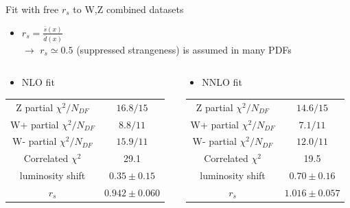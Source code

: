 \begin{frame}{Fit with free $r_s$ to W,Z combined datasets}
\begin{itemize}
\item{$r_s = \frac{\bar{s}(x)}{\bar{d}(x)}$ \\
$\rightarrow$  $r_s \simeq 0.5$ (suppressed strangeness) is assumed in many PDFs}
\end{itemize}

\begin{columns}
\begin{column}{5cm}
\begin{itemize}
\item{NLO fit}
\end{itemize}
\begin{table}
\begin{center}
\begin{small}
\begin{tabular}[c]{c|c}
Z partial $\chi^2/N_{DF}$   &     $16.8/15$        \\
W+ partial $\chi^2/N_{DF}$   &     $8.8/11$        \\
W- partial $\chi^2/N_{DF}$   &     $15.9/11$        \\
Correlated $\chi^2$      &        29.1          \\
luminosity shift         &     $0.35 \pm  0.15$ \\
$r_s$         &     \alert{$0.942 \pm 0.060$} \\
\end{tabular}
\end{small}
\end{center}
\end{table}
\end{column}
\begin{column}{5cm}
\begin{itemize}
\item{NNLO fit}
\end{itemize}
\begin{table}
\begin{center}
\begin{small}
\begin{tabular}[c]{c|c}
Z partial $\chi^2/N_{DF}$   &     $14.6/15$        \\
W+ partial $\chi^2/N_{DF}$   &     $7.1/11$        \\
W- partial $\chi^2/N_{DF}$   &     $12.0/11$        \\
Correlated $\chi^2$      &        19.5          \\
luminosity shift         &     $0.70 \pm  0.16$ \\
$r_s$         &     \alert{$1.016 \pm 0.057$} \\
\end{tabular}
\end{small}
\end{center}
\end{table}
\end{column}
\end{columns}


\end{frame}
